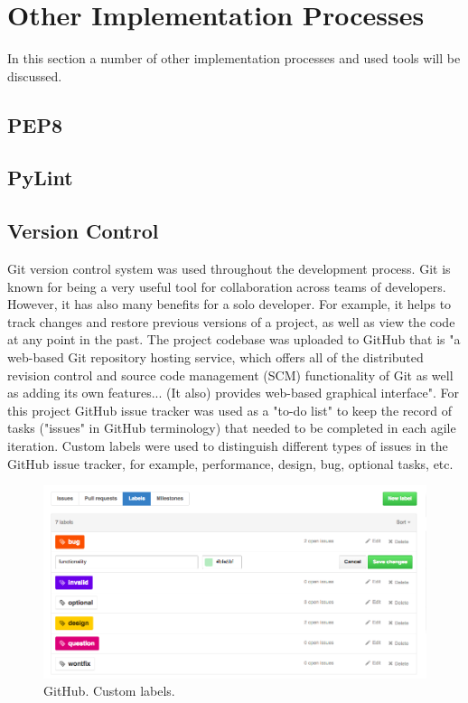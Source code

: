 \section{Other Implementation Processes}
In this section a number of other implementation processes and used tools will be discussed.

\subsection{PEP8}
\subsection{PyLint}

\subsection{Version Control}
Git version control system was used throughout the development process. Git is known for being a very useful tool for collaboration across teams of developers. However, it has also many benefits for a solo developer. For example, it helps to track changes and restore previous versions of a project, as well as view the code at any point in the past. The project codebase was uploaded to GitHub that is \cite{wiki:GitHub} "a web-based Git repository hosting service, which offers all of the distributed revision control and source code management (SCM) functionality of Git as well as adding its own features... (It also) provides web-based graphical interface". For this project GitHub issue tracker was used as a "to-do list" to keep the record of tasks ("issues" in GitHub terminology) that needed to be completed in each agile iteration. Custom labels were used to distinguish different types of issues in the GitHub issue tracker, for example, performance, design, bug, optional tasks, etc. 

\begin{figure}[H]
	\begin{center}
		\includegraphics[width=.90\linewidth,natwidth=610,natheight=642]{impl/images/githubLabelsChoice}
		\caption{GitHub. Custom labels.} \label{fig:using:githubLabelsChoice}
	\end{center}
\end{figure}

